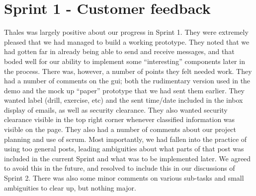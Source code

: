 \section{Sprint 1 - Customer feedback}

Thales was largely positive about our progress in Sprint 1. They were extremely pleased that we had managed to build a working prototype. They noted that we had gotten far in already being able to send and receive messages, and that boded well for our ability to implement some “interesting” components later in the process.
\newline
\newline
There was, however, a number of points they felt needed work. They had a number of comments on the \gls{gui}; both the rudimentary version used in the demo and the mock up “paper” prototype that we had sent them earlier. They wanted label (drill, exercise, etc) and the sent time/date included in the inbox display of emails, as well as security clearance. They also wanted security clearance visible in the top right corner whenever classified information was visible on the page. 
\newline
\newline
They also had a number of comments about our project planning and use of scrum. Most importantly, we had fallen into the practice of using too general posts, leading ambiguities about what parts of that post was included in the current Sprint and what was to be implemented later. We agreed to avoid this in the future, and resolved to include this in our discussions of Sprint 2. There was also some minor comments on various sub-tasks and small ambiguities to clear up, but nothing major.